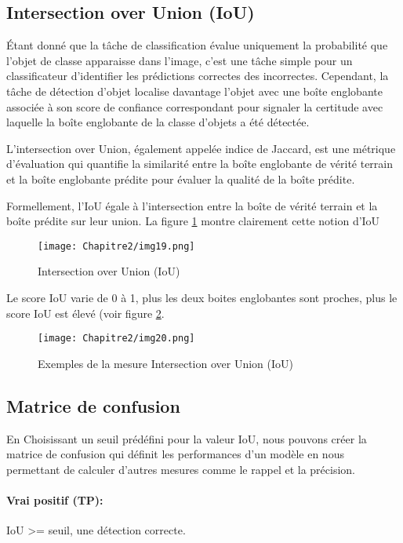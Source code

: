 \subsection{Intersection over Union (IoU)}
Étant donné que la tâche de classification évalue uniquement la probabilité que l'objet de classe apparaisse dans l'image, c'est une tâche simple pour un classificateur d'identifier les prédictions correctes des incorrectes. Cependant, la tâche de détection d'objet localise davantage l'objet avec une boîte englobante associée à son score de confiance correspondant pour signaler la certitude avec laquelle la boîte englobante de la classe d'objets a été détectée.

L'intersection over Union, également appelée indice de Jaccard, est une métrique d'évaluation qui quantifie la similarité entre la boîte englobante de vérité terrain  et la boîte englobante prédite pour évaluer la qualité de la boîte prédite. 

Formellement, l'IoU égale à l'intersection entre la boîte de vérité terrain et la boîte prédite sur leur union. La figure \ref{img19} montre clairement cette notion d'IoU
          \begin{figure}[H]
               \centering
               \texttt{[image: Chapitre2/img19.png]}
               \caption{Intersection over Union (IoU)}
               \label{img19}
               \end{figure}

Le score IoU varie de 0 à 1, plus les deux boites englobantes sont proches, plus le score IoU est élevé (voir figure \ref{img20}.
          \begin{figure}[H]
               \centering
               \texttt{[image: Chapitre2/img20.png]}
               \caption{Exemples de la mesure Intersection over Union (IoU)}
               \label{img20}
               \end{figure}

\subsection{Matrice de confusion}

En Choisissant un seuil prédéfini pour la valeur IoU, nous pouvons créer la matrice de confusion qui définit les performances d'un modèle en nous permettant de calculer d'autres mesures comme le rappel et la précision.
          \paragraph{Vrai positif (TP):} IoU >= seuil, une détection correcte. 
